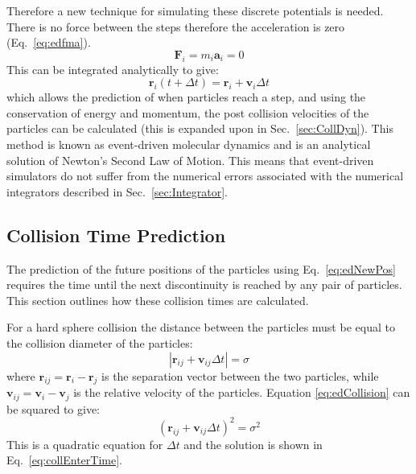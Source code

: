 \documentclass[12pt]{UoAthesis} \usepackage{booktabs}
\begin{document}
Therefore a new technique for simulating these discrete potentials is
needed.  There is no force between the steps therefore the
acceleration is zero (Eq.~\eqref{eq:edfma}).
\begin{equation} 
  \mathbf{F}_i = m_i \mathbf{a}_i = 0 \label{eq:edfma}
\end{equation}
This can be integrated analytically to give:
\begin{equation}
  \mathbf{r}_i(t+\Delta t) = \mathbf{r}_i + \mathbf{v}_i\Delta t \label{eq:edNewPos}
\end{equation}
which allows the prediction of when particles reach a step, and using
the conservation of energy and momentum, the post collision velocities
of the particles can be calculated (this is expanded upon in
Sec.~\ref{sec:CollDyn}).  This method is known as event-driven
molecular dynamics and is an analytical solution of Newton's Second
Law of Motion.  This means that event-driven simulators do not suffer
from the numerical errors associated with the numerical integrators
described in Sec.~\ref{sec:Integrator}.

\subsection{Collision Time Prediction}
The prediction of the future positions of the particles using
Eq.~\eqref{eq:edNewPos} requires the time until the next
discontinuity is reached by any pair of particles. This section
outlines how these collision times are calculated.

For a hard sphere collision the distance between the particles must be
equal to the collision diameter of the particles:
\begin{equation}
 |\mathbf{r}_{ij} + \mathbf{v}_{ij}\Delta t| = \sigma \label{eq:edCollision}
\end{equation}
where $\mathbf{r}_{ij} = \mathbf{r}_i - \mathbf{r}_j$ is the
separation vector between the two particles, while $\mathbf{v}_{ij} =
\mathbf{v}_i - \mathbf{v}_j$ is the relative velocity of the
particles.  Equation \eqref{eq:edCollision} can be squared to give:
\begin{equation}
 (\mathbf{r}_{ij} + \mathbf{v}_{ij}\Delta t)^2 = \sigma^2 \label{eq:edCollisionSqr}
\end{equation}
This is a quadratic equation for $\Delta t$ and the solution is shown
in Eq.~\eqref{eq:collEnterTime}.  
\end{document}
